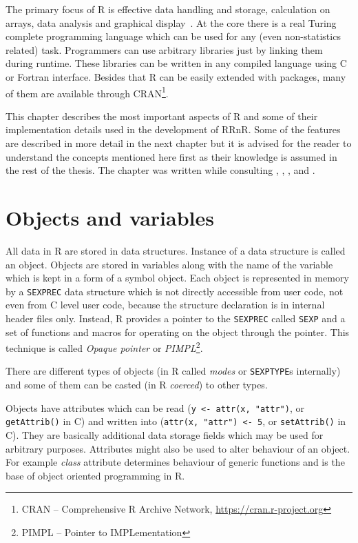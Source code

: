 \documentclass[thesis=M,english,hidelinks]{FITthesis}[2012/10/20]
\begin{document}
The primary focus of R is effective data handling and storage, calculation on arrays, data analysis and graphical display~\cite{r_intro}. At the core there is a real Turing complete programming language which can be used for any (even non-statistics related) task. Programmers can use arbitrary libraries just by linking them during runtime. These libraries can be written in any compiled language using C or Fortran interface. Besides that R can be easily extended with packages, many of them are available through CRAN\footnote{CRAN -- Comprehensive R Archive Network, \url{https://cran.r-project.org}}.\par

This chapter describes the most important aspects of R and some of their implementation details used in the development of RRnR. Some of the features are described in more detail in the next chapter but it is advised for the reader to understand the concepts mentioned here first as their knowledge is assumed in the rest of the thesis. The chapter was written while consulting \cite{r_intro}, \cite{r_lang_def}, \cite{r_extensions}, \cite{adv_r} and \cite{r_internals}.\par
	
	\section{Objects and variables}
	All data in R are stored in data structures. Instance of a data structure is called an object. Objects are stored in variables along with the name of the variable which is kept in a form of a symbol object. Each object is represented in memory by a \lstinline|SEXPREC| data structure which is not directly accessible from user code, not even from C level user code, because the structure declaration is in internal header files only. Instead, R provides a pointer to the \lstinline|SEXPREC| called \lstinline|SEXP| and a set of functions and macros for operating on the object through the pointer. This technique is called \emph{Opaque pointer} or \emph{PIMPL}\footnote{PIMPL -- Pointer to IMPLementation}.\par
	
	There are different types of objects (in R called \emph{modes} or \lstinline|SEXPTYPE|s internally) and some of them can be casted (in R \emph{coerced}) to other types.\par
	
	Objects have attributes which can be read (\lstinline|y <- attr(x, "attr")|, or \lstinline|getAttrib()| in C) and written into (\lstinline|attr(x, "attr") <- 5|, or \lstinline|setAttrib()| in C). They are basically additional data storage fields which may be used for arbitrary purposes. Attributes might also be used to alter behaviour of an object. For example \emph{class} attribute determines behaviour of generic functions and is the base of object oriented programming in R.\par
	
\end{document}
